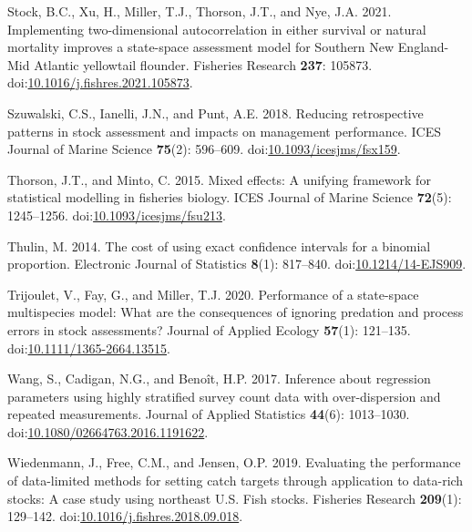 \documentclass[
  12pt,
]{article}
\newlength{\cslhangindent}
\newenvironment{CSLReferences}[2] %
 {\begin{list}{}{%
  \setlength{\itemindent}{0pt} %
  \setlength{\leftmargin}{0pt} %
  \setlength{\parsep}{0pt} %
  \ifodd #1
   \setlength{\leftmargin}{\cslhangindent} %
   \setlength{\itemindent}{-1\cslhangindent} %
  \fi
  \setlength{\itemsep}{#2\baselineskip}}} %
 {\end{list}} %
\begin{document}
\begin{CSLReferences}{1}{0}
Stock, B.C., Xu, H., Miller, T.J., Thorson, J.T., and Nye, J.A. 2021.
{Implementing two-dimensional autocorrelation in either survival or
natural mortality improves a state-space assessment model for Southern
{N}ew {E}ngland-Mid {A}tlantic yellowtail flounder}. Fisheries Research
\textbf{237}: 105873.
doi:\href{https://doi.org/10.1016/j.fishres.2021.105873}{10.1016/j.fishres.2021.105873}.

Szuwalski, C.S., Ianelli, J.N., and Punt, A.E. 2018. Reducing
retrospective patterns in stock assessment and impacts on management
performance. ICES Journal of Marine Science \textbf{75}(2): 596--609.
doi:\href{https://doi.org/10.1093/icesjms/fsx159}{10.1093/icesjms/fsx159}.

Thorson, J.T., and Minto, C. 2015. Mixed effects: A unifying framework
for statistical modelling in fisheries biology. ICES Journal of Marine
Science \textbf{72}(5): 1245--1256.
doi:\href{https://doi.org/10.1093/icesjms/fsu213}{10.1093/icesjms/fsu213}.

Thulin, M. 2014. {The cost of using exact confidence intervals for a
binomial proportion}. Electronic Journal of Statistics \textbf{8}(1):
817--840.
doi:\href{https://doi.org/10.1214/14-EJS909}{10.1214/14-EJS909}.

Trijoulet, V., Fay, G., and Miller, T.J. 2020. Performance of a
state-space multispecies model: What are the consequences of ignoring
predation and process errors in stock assessments? Journal of Applied
Ecology \textbf{57}(1): 121--135.
doi:\href{https://doi.org/10.1111/1365-2664.13515}{10.1111/1365-2664.13515}.

Wang, S., Cadigan, N.G., and Benoît, H.P. 2017. Inference about
regression parameters using highly stratified survey count data with
over-dispersion and repeated measurements. Journal of Applied Statistics
\textbf{44}(6): 1013--1030.
doi:\href{https://doi.org/10.1080/02664763.2016.1191622}{10.1080/02664763.2016.1191622}.

Wiedenmann, J., Free, C.M., and Jensen, O.P. 2019. Evaluating the
performance of data-limited methods for setting catch targets through
application to data-rich stocks: A case study using northeast {U.S.}
Fish stocks. Fisheries Research \textbf{209}(1): 129--142.
doi:\href{https://doi.org/10.1016/j.fishres.2018.09.018}{10.1016/j.fishres.2018.09.018}.


\end{CSLReferences}
\end{document}
